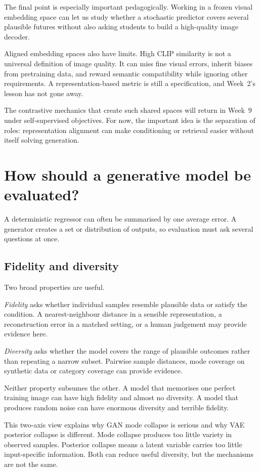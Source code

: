 The final point is especially important pedagogically. Working in a frozen visual embedding space can let us study whether a stochastic predictor covers several plausible futures without also asking students to build a high-quality image decoder.

Aligned embedding spaces also have limits. High CLIP similarity is not a universal definition of image quality. It can miss fine visual errors, inherit biases from pretraining data, and reward semantic compatibility while ignoring other requirements. A representation-based metric is still a specification, and Week~2's lesson has not gone away.

The contrastive mechanics that create such shared spaces will return in Week~9 under self-supervised objectives. For now, the important idea is the separation of roles: representation alignment can make conditioning or retrieval easier without itself solving generation.

\section{How should a generative model be evaluated?}

A deterministic regressor can often be summarised by one average error. A generator creates a set or distribution of outputs, so evaluation must ask several questions at once.

\subsection{Fidelity and diversity}

Two broad properties are useful.

\emph{Fidelity} asks whether individual samples resemble plausible data or satisfy the condition. A nearest-neighbour distance in a sensible representation, a reconstruction error in a matched setting, or a human judgement may provide evidence here.

\emph{Diversity} asks whether the model covers the range of plausible outcomes rather than repeating a narrow subset. Pairwise sample distances, mode coverage on synthetic data or category coverage can provide evidence.

Neither property subsumes the other. A model that memorises one perfect training image can have high fidelity and almost no diversity. A model that produces random noise can have enormous diversity and terrible fidelity.

This two-axis view explains why GAN mode collapse is serious and why VAE posterior collapse is different. Mode collapse produces too little variety in observed samples. Posterior collapse means a latent variable carries too little input-specific information. Both can reduce useful diversity, but the mechanisms are not the same.

